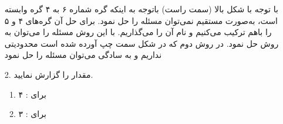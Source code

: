 \begin{enumerate}
	\item [ ]
	\begin{qsolve}
		با توجه با شکل بالا (سمت راست) باتوجه به اینکه گره شماره ۶ به ۴ گره وابسته است، به‌صورت مستقیم نمی‌توان مسئله را حل نمود. برای حل آن گره‌های ۴ و ۵ را باهم ترکیب می‌کنیم و نام آن را  می‌گذاریم. با این روش مسئله را می‌توان به روش  حل نمود. در روش دوم که در شکل سمت چپ آورده شده است محدودیتی نداریم و به سادگی می‌توان مسئله را حل نمود
	\end{qsolve}
	
	
	\item [2. ]
	مقدار  را گزارش نمایید.
	
	\begin{qsolve}
		\begin{enumerate}
			\item 
			برای \lr{N2N}: ۴
			\item 
			برای \lr{HyCUBE}: ۳
		\end{enumerate}
	\end{qsolve}
\end{enumerate}